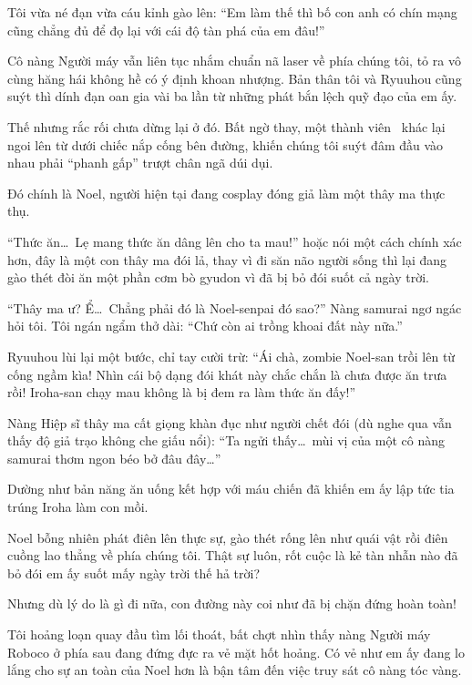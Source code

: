\documentclass[../main.tex]{subfiles}
\begin{document}
Tôi vừa né đạn vừa cáu kỉnh gào lên: ``Em làm thế thì bố con anh có chín mạng cũng chẳng đủ để đọ lại với cái độ tàn phá của em đâu!''

Cô nàng Người máy vẫn liên tục nhắm chuẩn nã laser về phía chúng tôi, tỏ ra vô cùng hăng hái không hề có ý định khoan nhượng. Bản thân tôi và Ryuuhou cũng suýt thì dính đạn oan gia vài ba lần từ những phát bắn lệch quỹ đạo của em ấy.

Thế nhưng rắc rối chưa dừng lại ở đó. Bất ngờ thay, một thành viên \hll\ khác lại ngoi lên từ dưới chiếc nắp cống bên đường, khiến chúng tôi suýt đâm đầu vào nhau phải ``phanh gấp'' trượt chân ngã dúi dụi.

Đó chính là Noel, người hiện tại đang cosplay đóng giả làm một thây ma thực thụ.

``Thức ăn\dots\ Lẹ mang thức ăn dâng lên cho ta mau!'' hoặc nói một cách chính xác hơn, đây là một con thây ma đói lả, thay vì đi săn não người sống thì lại đang gào thét đòi ăn một phần cơm bò gyudon vì đã bị bỏ đói suốt cả ngày trời.


``Thây ma ư? Ể\dots\ Chẳng phải đó là Noel-senpai đó sao?'' Nàng samurai ngơ ngác hỏi tôi. Tôi ngán ngẩm thở dài: ``Chứ còn ai trồng khoai đất này nữa.''

Ryuuhou lùi lại một bước, chỉ tay cười trừ: ``Ái chà, zombie Noel-san trồi lên từ cống ngầm kìa! Nhìn cái bộ dạng đói khát này chắc chắn là chưa được ăn trưa rồi! Iroha-san chạy mau không là bị đem ra làm thức ăn đấy!''

Nàng Hiệp sĩ thây ma cất giọng khàn đục như người chết đói (dù nghe qua vẫn thấy độ giả trạo không che giấu nổi): ``Ta ngửi thấy\dots\ mùi vị của một cô nàng samurai thơm ngon béo bở đâu đây\dots''

Dường như bản năng ăn uống kết hợp với máu chiến đã khiến em ấy lập tức tia trúng Iroha làm con mồi.

Noel bỗng nhiên phát điên lên thực sự, gào thét rống lên như quái vật rồi điên cuồng lao thẳng về phía chúng tôi. Thật sự luôn, rốt cuộc là kẻ tàn nhẫn nào đã bỏ đói em ấy suốt mấy ngày trời thế hả trời?

Nhưng dù lý do là gì đi nữa, con đường này coi như đã bị chặn đứng hoàn toàn!

Tôi hoảng loạn quay đầu tìm lối thoát, bất chợt nhìn thấy nàng Người máy Roboco ở phía sau đang đứng đực ra vẻ mặt hốt hoảng. Có vẻ như em ấy đang lo lắng cho sự an toàn của Noel hơn là bận tâm đến việc truy sát cô nàng tóc vàng.
\end{document}
